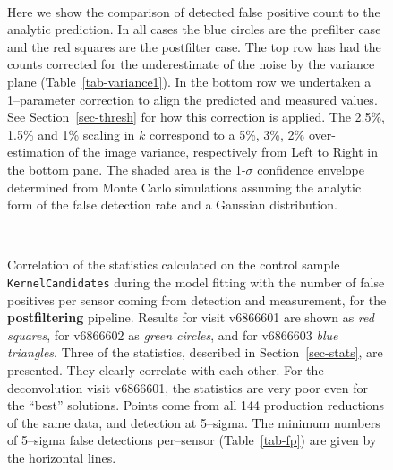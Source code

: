 \documentclass[prd, nofootinbib, floatfix, 11pt,tightenlines,times]{article}
\begin{document}
{\begin{figure}%
\captionsetup[subfloat]{labelformat=empty}
\centering
{}
\\
%
%
%
\caption{Here we show the comparison of detected false positive count to the analytic prediction.
In all cases the blue circles are the prefilter case and the red squares are the postfilter case.  
The top row has had the counts corrected for the underestimate of the noise by the variance plane (Table~\ref{tab-variance1}).  
In the bottom row we undertaken a 1--parameter correction to align the predicted and measured values.  See Section~\ref{sec-thresh}
for how this correction is applied.  The 2.5\%, 1.5\% and 1\% scaling in $k$ correspond to a 5\%, 3\%, 2\% over-estimation of the image variance, respectively
from Left to Right in the bottom pane.  
The shaded area is the 1-$\sigma$ confidence envelope
determined from Monte Carlo simulations assuming the analytic form of the false detection rate and a Gaussian distribution.}
\label{fig-fp_v_thresh}
\end{figure}


\begin{figure}
 \\
\caption{Correlation of the statistics calculated on the control
  sample {\tt KernelCandidates} during the model fitting with the
  number of false positives per sensor coming from
  detection and measurement, for the {\bf postfiltering} pipeline.
  Results for visit v6866601 are shown as {\it red squares}, for
  v6866602 as {\it green circles}, and for v6866603 {\it blue
    triangles}.  Three of the statistics, described in
  Section~\ref{sec-stats}, are presented.  They clearly correlate with
  each other.  For the deconvolution visit v6866601, the statistics
  are very poor even for the ``best'' solutions.  Points come from 
  all 144 production reductions of the same data, and detection at 5--sigma.
  The minimum numbers of 5--sigma false detections per--sensor (Table~\ref{tab-fp})
  are given by the horizontal lines.
}
\label{corrpost}
\end{figure}

}
\end{document}
